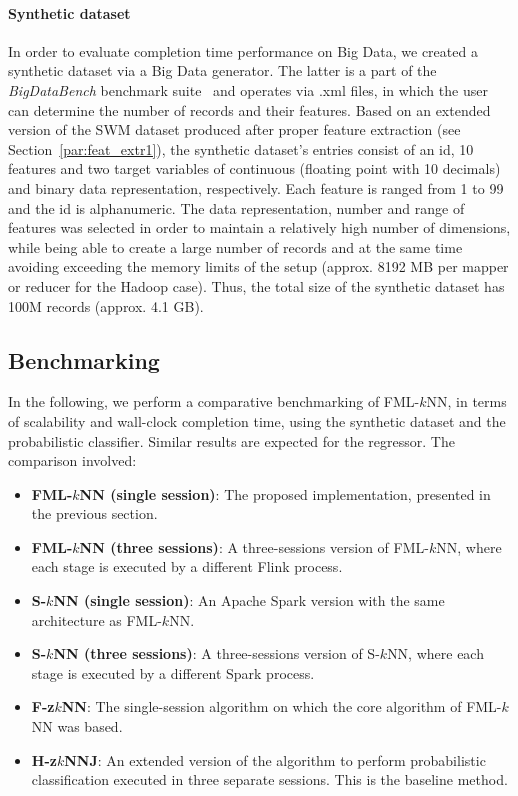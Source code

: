 \paragraph{Synthetic dataset}
\label{par:synthetic}
In order to evaluate completion time performance on Big Data, we created a synthetic dataset via a Big Data generator. The latter is a part of the \textit{BigDataBench} benchmark suite~\cite{bdbench} and operates via .xml files, in which the user can determine the number of records and their features. Based on an extended version of the SWM dataset produced after proper feature extraction (see Section~\ref{par:feat_extr1}), the synthetic dataset's entries consist of an id, 10 features and two target variables of continuous (floating point with 10 decimals) and binary data representation, respectively. Each feature is ranged from 1 to 99 and the id is alphanumeric. The data representation, number and range of features was selected in order to maintain a relatively high number of dimensions, while being able to create a large number of records and at the same time avoiding exceeding the memory limits of the setup (approx. 8192 MB per mapper or reducer for the Hadoop case). Thus, the total size of the synthetic dataset has 100M records (approx. 4.1 GB).

\subsection{Benchmarking}
\label{subsec:fml$k$NN_performance}
In the following, we perform a comparative benchmarking of FML-$k$NN, in terms of scalability and wall-clock completion time, using the synthetic dataset and the probabilistic classifier. Similar results are expected for the regressor. The comparison involved:

\begin{itemize}
	\item \textbf{FML-$k$NN (single session)}: The proposed implementation, presented in the previous section.
	\item \textbf{FML-$k$NN (three sessions)}: A three-sessions version of FML-$k$NN, where each stage is executed by a different Flink process.
	\item \textbf{S-$k$NN (single session)}: An Apache Spark version with the same architecture as FML-$k$NN.
	\item \textbf{S-$k$NN (three sessions)}: A three-sessions version of S-$k$NN, where each stage is executed by a different Spark process.
	\item \textbf{F-z$k$NN}: The single-session algorithm on which the core algorithm of FML-$k$NN was based.
	\item \textbf{H-z$k$NNJ}: An extended version of the algorithm to perform probabilistic classification executed in three separate sessions. This is the baseline method. 
\end{itemize}

